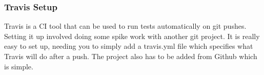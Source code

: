 \subsubsection{Travis Setup}
Travis is a CI tool that can be used to run tests automatically on git pushes. Setting it up involved doing some spike work with another git project. It is really easy to set up, needing you to simply add a travis.yml file which specifies what Travis will do after a push. The project also has to be added from Github which is simple.
\newpage
